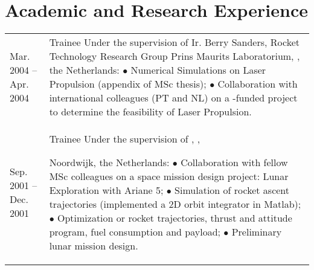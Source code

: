 \documentclass[a4paper]{article}
\newcommand{\dynhref}[2]{%
  \iftoggle{expliciturl}{%
    #2 (\href{#1}{\texttt{\detokenize{#1}}})%
  }{%
    \href{#1}{#2}%
  }%
}
\newlength{\listskipbig}
\newenvironment{cvsection}[2]{
  \setlength{\floatsep}{0pt}
  \setlength{\textfloatsep}{0pt}
  \setlength{\intextsep}{0pt}
  \section*{#1}
  \begin{longtable}{lp{#2}}
}{
  \end{longtable}
}
\begin{document}
\begin{cvsection}{Academic and Research Experience}{11.0cm}
Mar. 2004 -- Apr. 2004
  & Trainee\newline
    Under the supervision of Ir. Berry Sanders, Rocket Technology Research Group
    Prins Maurits Laboratorium, \dynhref{http://www.tno.nl/}{TNO}, the Netherlands:\newline
      $\bullet$ Numerical Simulations on Laser Propulsion (appendix of MSc thesis);\newline
      $\bullet$ Collaboration with international colleagues (PT and NL) on a \dynhref{http://www.esa.int}{ESA}-funded project to determine the feasibility of Laser Propulsion.
    \\[\listskipbig]

Sep. 2001 -- Dec. 2001
  & Trainee\newline
    Under the supervision of \dynhref{https://en.wikipedia.org/wiki/Wubbo_Ockels}{Prof Wubbo Ockels},
    \dynhref{http://www.esa.int/About_Us/ESTEC}{European Space research and Technology Center (ESTEC)}, \dynhref{http://www.esa.int}{ESA}
    Noordwijk, the Netherlands:\newline
      $\bullet$ Collaboration with fellow MSc colleagues on a space mission design project: Lunar Exploration with Ariane 5;\newline
      $\bullet$ Simulation of rocket ascent trajectories (implemented a 2D orbit integrator in Matlab);\newline
      $\bullet$ Optimization or rocket trajectories, thrust and attitude program, fuel consumption and payload;\newline
      $\bullet$ Preliminary lunar mission design.
    \\[\listskipbig]

\end{cvsection}


\end{document}
